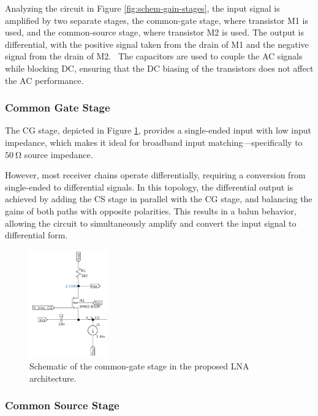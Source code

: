 Analyzing the circuit in Figure \ref{fig:schem-gain-stages}, the input signal is amplified by two separate stages, the common-gate stage, where transistor M1 is used, and the common-source stage, where transistor M2 is used. The output is differential, with the positive signal taken from the drain of M1 and the negative signal from the drain of M2. ~The capacitors are used to couple the AC signals while blocking DC, ensuring that the DC biasing of the transistors does not affect the AC performance. 

\subsubsection{Common Gate Stage}

The CG stage, depicted in Figure \ref{fig:schem-cg}, provides a single-ended input with low input impedance, which makes it ideal for broadband input matching—specifically to $\SI{50}{\ohm}$ source impedance.

However, most receiver chains operate differentially, requiring a conversion from single-ended to differential signals. In this topology, the differential output is achieved by adding the CS stage in parallel with the CG stage, and balancing the gains of both paths with opposite polarities. This results in a balun behavior, allowing the circuit to simultaneously amplify and convert the input signal to differential form.

\begin{figure}[H]
    \centering
    \includegraphics[width=0.3\textwidth]{Images/schem-CG.png}
    \caption{Schematic of the common-gate stage in the proposed LNA architecture.}
    \label{fig:schem-cg}
\end{figure}

\subsubsection{Common Source Stage}

